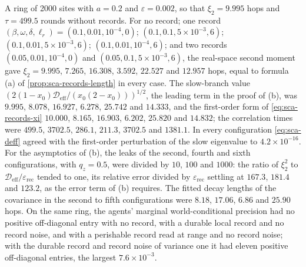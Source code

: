 \begin{numcheck}\label{chk:sca-records-length}
A ring of 2000 sites with $a=0.2$ and $\varepsilon=0.002$, so that $\xi_2=9.995$ hops and $\tau=499.5$ rounds without records. For no record; one record $(\beta,\omega,\delta,\ell_r)=(0.1,0.01,10^{-4},0)$; $(0.1,0.1,5\times10^{-3},6)$; $(0.1,0.01,5\times10^{-3},6)$; $(0.1,0.01,10^{-4},6)$; and two records $(0.05,0.01,10^{-4},0)$ and $(0.05,0.1,5\times10^{-3},6)$, the real-space second moment gave $\xi_2=9.995$, $7.265$, $16.308$, $3.592$, $22.527$ and $12.957$ hops, equal to formula (a) of \cref{prop:sca-records-length} in every case. The slow-branch value $(2(1-x_0)\mathcal D_{\mathrm{eff}}/(x_0(2-x_0)))^{1/2}$, the leading term in the proof of (b), was $9.995$, $8.078$, $16.927$, $6.278$, $25.742$ and $14.333$, and the first-order form of \eqref{eq:sca-records-xi} $10.000$, $8.165$, $16.903$, $6.202$, $25.820$ and $14.832$; the correlation times were $499.5$, $3702.5$, $286.1$, $211.3$, $3702.5$ and $1381.1$. In every configuration \eqref{eq:sca-deff} agreed with the first-order perturbation of the slow eigenvalue to $4.2\times10^{-16}$. For the asymptotics of (b), the leaks of the second, fourth and sixth configurations, with $q_z=0.5$, were divided by $10$, $100$ and $1000$: the ratio of $\xi_2^2$ to $\mathcal D_{\mathrm{eff}}/\varepsilon_{\mathrm{rec}}$ tended to one, its relative error divided by $\varepsilon_{\mathrm{rec}}$ settling at $167.3$, $181.4$ and $123.2$, as the error term of (b) requires. The fitted decay lengths of the covariance in the second to fifth configurations were $8.18$, $17.06$, $6.86$ and $25.90$ hops. On the same ring, the agents' marginal world-conditional precision had no positive off-diagonal entry with no record, with a durable local record and no record noise, and with a perishable record read at range and no record noise; with the durable record and record noise of variance one it had eleven positive off-diagonal entries, the largest $7.6\times10^{-3}$.
\end{numcheck}

